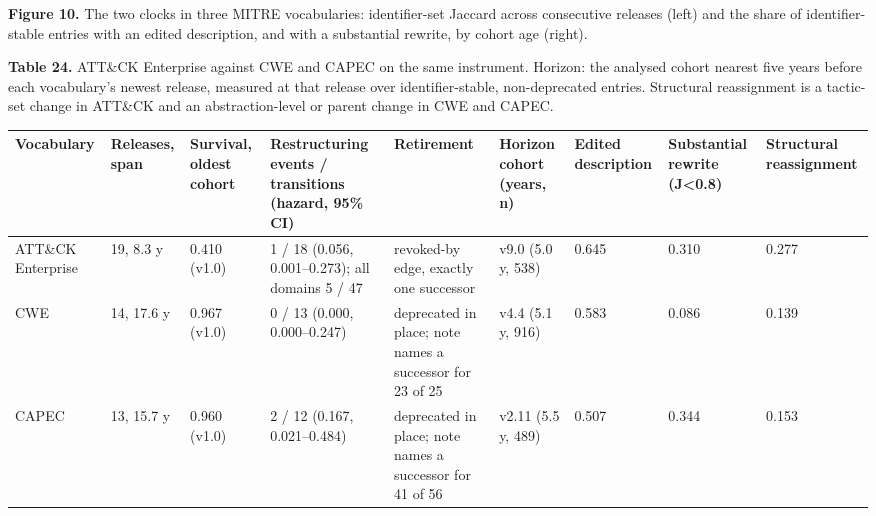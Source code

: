 \documentclass[11pt,a4paper]{article}
\begin{document}
\textbf{Figure 10.} The two clocks in three MITRE vocabularies: identifier-set Jaccard across consecutive releases (left) and the share of identifier-stable entries with an edited description, and with a substantial rewrite, by cohort age (right).

\textbf{Table 24.} ATT\&CK Enterprise against CWE and CAPEC on the same instrument. Horizon: the analysed cohort nearest five years before each vocabulary's newest release, measured at that release over identifier-stable, non-deprecated entries. Structural reassignment is a tactic-set change in ATT\&CK and an abstraction-level or parent change in CWE and CAPEC.

\begin{center}\footnotesize
\begin{tabular}{lllllllll}
\toprule
Vocabulary & Releases, span & Survival, oldest cohort & Restructuring events / transitions (hazard, 95\% CI) & Retirement & Horizon cohort (years, n) & Edited description & Substantial rewrite (J<0.8) & Structural reassignment \\
\midrule
ATT\&CK Enterprise & 19, 8.3 y & 0.410 (v1.0) & 1 / 18 (0.056, 0.001–0.273); all domains 5 / 47 & revoked-by edge, exactly one successor & v9.0 (5.0 y, 538) & 0.645 & 0.310 & 0.277 \\
CWE & 14, 17.6 y & 0.967 (v1.0) & 0 / 13 (0.000, 0.000–0.247) & deprecated in place; note names a successor for 23 of 25 & v4.4 (5.1 y, 916) & 0.583 & 0.086 & 0.139 \\
CAPEC & 13, 15.7 y & 0.960 (v1.0) & 2 / 12 (0.167, 0.021–0.484) & deprecated in place; note names a successor for 41 of 56 & v2.11 (5.5 y, 489) & 0.507 & 0.344 & 0.153 \\
\bottomrule
\end{tabular}
\end{center}
\end{document}
